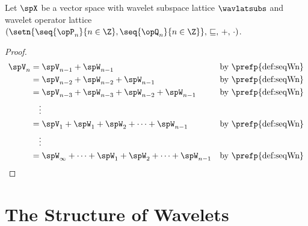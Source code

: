 \begin{theorem}
\label{thm:wav_approx}
Let $\spX$ be a vector space with 
wavelet subspace lattice
$\wavlatsubs$
and wavelet operator lattice
$(\setn{\seq{\opP_n}{n\in\Z},\seq{\opQ_n}{n\in\Z}},\,\sqsubseteq,\,+,\,\cdot)$.
\end{theorem}
\begin{proof}
  \begin{align*}
    \spV_n
      &= \spV_{n-1} + \spW_{n-1}
      && \text{by \prefp{def:seqWn}}
    \\&= \spV_{n-2} + \spW_{n-2} + \spW_{n-1}
      && \text{by \prefp{def:seqWn}}
    \\&= \spV_{n-3} + \spW_{n-3} + \spW_{n-2} + \spW_{n-1}
      && \text{by \prefp{def:seqWn}}
    \\&\quad\vdots
    \\&= \spV_{1} + \spW_{1} + \spW_{2} +\cdots+ \spW_{n-1}
      && \text{by \prefp{def:seqWn}}
    \\&\quad\vdots
    \\&= \spW_{\infty}+\cdots + \spW_{1} + \spW_{2} +\cdots+ \spW_{n-1}
      && \text{by \prefp{def:seqWn}}
  \end{align*}
\end{proof}


 

\chapter{The Structure of Wavelets}

